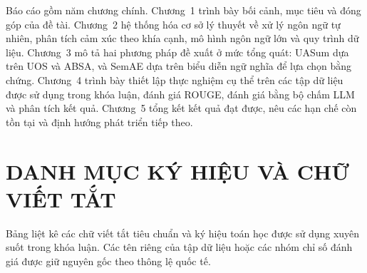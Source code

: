 \documentclass[12pt,a4paper]{report}
\begin{document}
Báo cáo gồm năm chương chính. Chương~1 trình bày bối cảnh, mục tiêu và đóng góp của đề tài. Chương~2 hệ thống hóa cơ sở lý thuyết về xử lý ngôn ngữ tự nhiên, phân tích cảm xúc theo khía cạnh, mô hình ngôn ngữ lớn và quy trình dữ liệu. Chương~3 mô tả hai phương pháp đề xuất ở mức tổng quát: UASum dựa trên UOS và ABSA, và SemAE dựa trên biểu diễn ngữ nghĩa để lựa chọn bằng chứng. Chương~4 trình bày thiết lập thực nghiệm cụ thể trên các tập dữ liệu được sử dụng trong khóa luận, đánh giá ROUGE, đánh giá bằng bộ chấm LLM và phân tích kết quả. Chương~5 tổng kết kết quả đạt được, nêu các hạn chế còn tồn tại và định hướng phát triển tiếp theo.

\clearpage

\chapter*{DANH MỤC KÝ HIỆU VÀ CHỮ VIẾT TẮT}
{}

Bảng liệt kê các chữ viết tắt tiêu chuẩn và ký hiệu toán học được sử dụng xuyên suốt trong khóa luận. Các tên riêng của tập dữ liệu hoặc các nhóm chỉ số đánh giá được giữ nguyên gốc theo thông lệ quốc tế.
\end{document}
